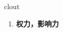 
\begin{frame}
{\huge clout}
\begin{center}
\begin{enumerate}\Large
  \item \textbf{权力，影响力}
\end{enumerate}
\end{center}
\end{frame}
